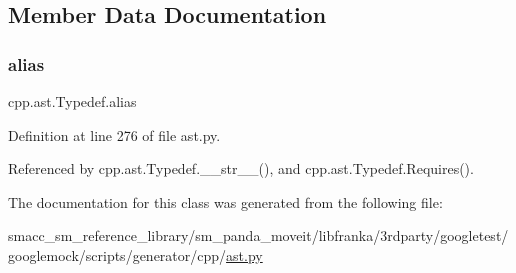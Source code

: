\subsection{Member Data Documentation}
\mbox{\label{classcpp_1_1ast_1_1Typedef_a3187a504dfbefe50b866b44902823c30}} 
\subsubsection{\texorpdfstring{alias}{alias}}
{\footnotesize\ttfamily cpp.\+ast.\+Typedef.\+alias}



Definition at line 276 of file ast.\+py.



Referenced by cpp.\+ast.\+Typedef.\+\_\+\+\_\+str\+\_\+\+\_\+(), and cpp.\+ast.\+Typedef.\+Requires().



The documentation for this class was generated from the following file\+:\begin{DoxyCompactItemize}
\item 
smacc\+\_\+sm\+\_\+reference\+\_\+library/sm\+\_\+panda\+\_\+moveit/libfranka/3rdparty/googletest/googlemock/scripts/generator/cpp/\hyperlink{ast_8py}{ast.\+py}\end{DoxyCompactItemize}

